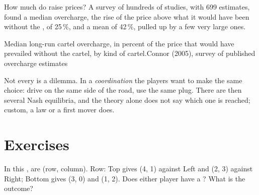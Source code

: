 How much do  raise prices? A survey of hundreds of studies, with 699 estimates, found a median overcharge, the rise of the price above what it would have been
without the , of 25\,\%, and a mean of 42\,\%, pulled up by a few very large ones.

\begin{omchart}{Median long-run cartel overcharge, in percent of the price that would have prevailed without the cartel, by kind of cartel.}{Connor (2005), survey of
published overcharge estimates}
\end{omchart}

Not every  is a dilemma. In a \emph{coordination } the players want to make the same choice: drive on the same side of the road, use the same plug. There
are then several Nash equilibria, and the theory alone does not say which one is reached; custom, a law or a first mover does.

\section{Exercises}

\begin{exercise}[$\star$]\label{exo:g11:oligopoly-and-games:1}
In this ,  are (row, column). Row: Top gives (4, 1) against Left and (2, 3) against Right; Bottom gives (3, 0) and (1, 2). Does either player have a ? What is the outcome?
\end{exercise}

